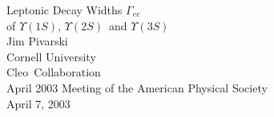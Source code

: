 

\def\ys{$\Upsilon(1S)$}
\def\yss{$\Upsilon(2S)$}
\def\ysss{$\Upsilon(3S)$}
\def\gamee{$\Gamma_{ee}$}
\def\cleo{{\sc Cleo}}
\def\cleoii{{\sc Cleo II}}
\def\cleoiii{{\sc Cleo III}}

\newcommand{\talktitle}[0]{Leptonic Decay Widths \gamee\ of \ys, \yss\ and \ysss}
\newcommand{\fmttitle}[0]{}
\newcommand{\conftitle}[0]{April 2003 Meeting of the American Physical Society}
\newcommand{\myname}[0]{Jim Pivarski}
\newcommand{\affila}[0]{Cornell University}
\newcommand{\talkdate}[0]{April 7, 2003}

\pagestyle{conference}   %




\slideheight 7.0in
\slidewidth 8.8in 

\renewcommand{\arraystretch}{0.3}
\renewcommand{\slidetopmargin}{0.4in}
\renewcommand{\slidebottommargin}{0.9in}



\begin{slide*}

\slideframe{}

\begin{center}
\vspace{4 cm}
{\Huge Leptonic Decay Widths \gamee \\
\vspace{0.25 cm}
of \ys, \yss\  and \ysss}  \\
\vspace{1 cm}
{\LARGE	Jim Pivarski } \\
\vspace{0.25 cm}
{\Large	Cornell University } \\
\vspace{1 cm}
{\LARGE	\cleo\  Collaboration } \\
\vspace{2 cm}
\conftitle \\
{\large \talkdate}

\end{center}

\end{slide*}

